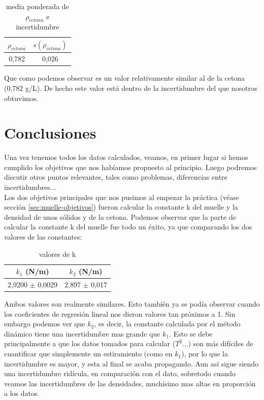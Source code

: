 \documentclass[12pt,a4paper]{book}
\begin{document}
\begin{table}[h!]
\centering
\begin{tabular}{|c|c|}
\hline
$\rho_{cetona} $ & $s(\rho_{cetona})$ \\ \hline
0,782 & 0,026 \\ \hline
\end{tabular}
\caption{media ponderada de $\rho_{cetona}$ e incertidumbre}
\label{Tab:muelle-densidad-cetona}
\end{table}

Que como podemos observar es un valor relativamente similar al de la cetona (0,782 g/L). De hecho este valor está dentro de la incertidumbre del que nosotros obtuvimos.

\section{Conclusiones}
Una vez tenemos todos los datos calculados, veamos, en primer lugar si hemos cumplido los objetivos que nos habíamos propuesto al principio. Luego podremos discutir otros puntos relevantes, tales como problemas, diferencias entre incertidumbres... \\

Los dos objetivos principales que nos pusimos al empezar la práctica (véase sección \ref{sec:muelle-objetivos}) fueron calcular la constante k del muelle y la densidad de unos sólidos y de la cetona. Podemos observar que la parte de calcular la constante k del muelle fue todo un éxito, ya que comparando los dos valores de las constantes:

\begin{table}[h!]
\centering
\begin{tabular}{|c|c|}
\hline
$k_1$ (N/m) & $k_2$  (N/m) \\ \hline
2,9200 $\pm$ 0,0029 & 2,897 $\pm$ 0,017 \\ \hline
\end{tabular}
\caption{valores de k}
\end{table}

Ambos valores son realmente similares. Esto también ya se podía observar cuando los coeficientes de regresión lineal nos dieron valores tan próximos a 1. Sin embargo podemos ver que $k_2$, es decir, la constante calculada por el método dinámico tiene una incertidumbre mas grande que $k_1$. Esto se debe principalmente a que los datos tomados para calcular ($T^2$...) son más difíciles de cuantificar que simplemente un estiramiento (como en $k_1$), por lo que la incertidumbre es mayor, y esta al final se acaba propagando. Aun así sigue siendo una incertidumbre ridícula, en comparación con el dato, sobretodo cuando veamos las incertidumbres de las densidades, muchísimo mas altas en proporción a los datos. \\
\end{document}
